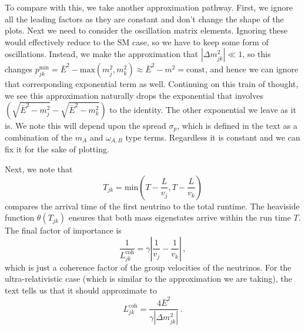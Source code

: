 \documentclass[10pt]{article}
\begin{document}
To compare with this, we take another approximation pathway. First, we ignore all the leading factors as they are constant and don't change the shape of the plots. Next we need to consider the oscillation matrix elements. Ignoring these would effectively reduce to the SM case, so we have to keep some form of oscillations. Instead, we make the approximation that $|\Delta m_{jk}^{2}| \ll 1$, so this changes $p_{jk}^{\text{min}} = \bar{E}^{2} - \text{max}(m_{j}^{2},m_{k}^{2}) \approx \bar{E}^{2} - m^{2} = \text{const}$, and hence we can ignore that corresponding exponential term as well. Continuing on this train of thought, we see this approximation naturally drops the exponential that involves $\left(\sqrt{\bar{E}^{2} - m_{j}^{2}} - \sqrt{\bar{E}^{2} - m_{k}^{2}}\right)$ to the identity. The other exponential we leave as it is. We note this will depend upon the spread $\sigma_{p}$, which is defined in the text as a combination of the $m_{A}$ and $\omega_{A,B}$ type terms. Regardless it is constant and we can fix it for the sake of plotting.

Next, we note that
\begin{equation}
  T_{jk} = \text{min}\left(T - \frac{L}{v_{j}}, T - \frac{L}{v_{k}}\right)
\end{equation}
compares the arrival time of the first neutrino to the total runtime. The heaviside function $\theta(T_{jk})$ ensures that both mass eigenstates arrive within the run time $T$. The final factor of importance is
\begin{equation}
  \frac{1}{L_{jk}^{\text{coh}}} = \gamma\left |\frac{1}{v_{j}} - \frac{1}{v_{k}}\right|\, ,
\end{equation}
which is just a coherence factor of the group velocities of the neutrinos. For the ultra-relativistic case (which is similar to the approximation we are taking), the text \cite{Akhmedov_2008} tells us that it should approximate to
\begin{equation}
  L_{jk}^{\text{coh}} = \frac{4\bar{E}^{2}}{\gamma|\Delta m_{jk}^{2}|}\,.
\end{equation}
\end{document}
